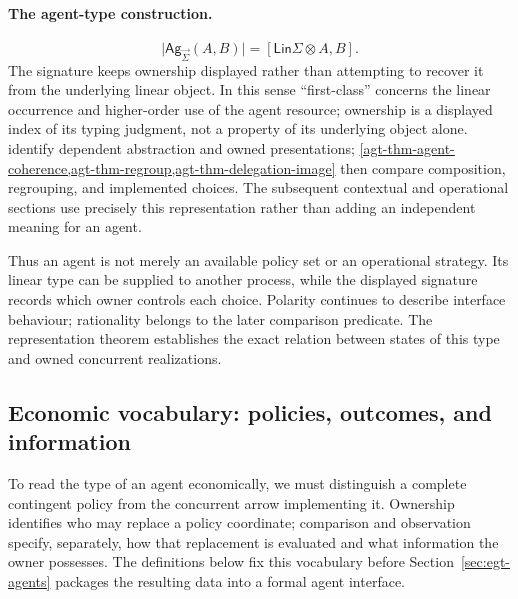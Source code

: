 \documentclass[11pt,a4paper]{article}
\numberwithin{equation}{section}
\theoremstyle{definition}
\theoremstyle{remark}
\theoremstyle{plain}
\providecommand{\Ag}{\mathsf{Ag}}
\providecommand{\sig}{\vec{\Sigma}}
\providecommand{\Lin}{\mathsf{Lin}}
\begin{document}
\paragraph{The agent-type construction.}
\begin{equation}
\bigl|\Ag_{\sig}(A,B)\bigr|=[\Lin\Sigma\otimes A,B].
\label{agt-eq-agent-overview}
\end{equation}
The signature keeps ownership displayed rather than attempting to
recover it from the underlying linear object. In this sense
``first-class'' concerns the linear occurrence and higher-order use of
the agent resource; ownership is a displayed index of its typing judgment,
not a property of its underlying object alone.
identify dependent abstraction and owned presentations;
\cref{agt-thm-agent-coherence,agt-thm-regroup,agt-thm-delegation-image}
then compare composition, regrouping, and implemented choices. The
subsequent contextual and operational sections use precisely this
representation rather than adding an independent meaning for an agent.

Thus an agent is not merely an available policy set or an operational
strategy. Its linear type can be supplied to another process, while the
displayed signature records which owner controls each choice. Polarity
continues to describe interface behaviour; rationality belongs to the
later comparison predicate. The representation theorem establishes the
exact relation between states of this type and owned concurrent
realizations.

\subsection{Economic vocabulary: policies, outcomes, and information}
\label{sec:egt-economic-vocabulary}

To read the type of an agent economically, we must distinguish a
complete contingent policy from the concurrent arrow implementing it.
Ownership identifies who may replace a policy coordinate; comparison and
observation specify, separately, how that replacement is evaluated and
what information the owner possesses. The definitions below fix this
vocabulary before Section~\ref{sec:egt-agents} packages the resulting
data into a formal agent interface.
\end{document}
